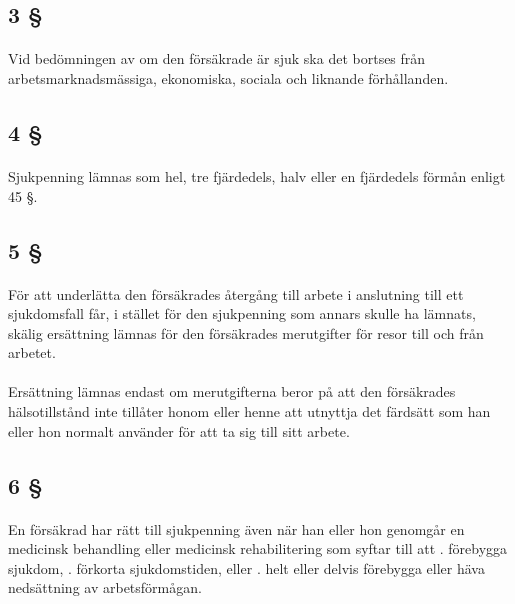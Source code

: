 \documentclass[a4paper,notitlepage,openany,10pt]{book}
\begin{document}
\subsection*{3 §}
\paragraph*{}
Vid bedömningen av om den försäkrade är sjuk ska det bortses från arbetsmarknadsmässiga, ekonomiska, sociala och liknande förhållanden.
\subsection*{4 §}
\paragraph*{}
Sjukpenning lämnas som hel, tre fjärdedels, halv eller en fjärdedels förmån enligt 45 §.
\subsection*{5 §}
\paragraph*{}
För att underlätta den försäkrades återgång till arbete i anslutning till ett sjukdomsfall får, i stället för den sjukpenning som annars skulle ha lämnats, skälig ersättning lämnas för den försäkrades merutgifter för resor till och från arbetet.
\paragraph*{}
Ersättning lämnas endast om merutgifterna beror på att den försäkrades hälsotillstånd inte tillåter honom eller henne att utnyttja det färdsätt som han eller hon normalt använder för att ta sig till sitt arbete.
\subsection*{6 §}
\paragraph*{}
En försäkrad har rätt till sjukpenning även när han eller hon genomgår en medicinsk behandling eller medicinsk rehabilitering som syftar till att
. förebygga sjukdom,
. förkorta sjukdomstiden, eller
. helt eller delvis förebygga eller häva nedsättning av arbetsförmågan.
\end{document}
